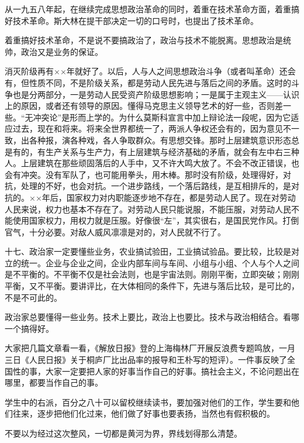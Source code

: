 从一九五八年起，在继续完成思想政治革命的同时，着重在技术革命方面，着重搞好技术革命。斯大林在提干部决定一切的口号时，也提出了技术革命。

着重搞好技术革命，不是说不要搞政治了，政治与技术不能脱离。思想政治是统帅，政治又是业务的保证。

消灭阶级再有××年就好了。以后，人与人之间思想政治斗争（或者叫革命）还会有，但性质不同，不是阶级关系，都是劳动人民先进与落后之间的矛盾。这时的斗争也是分两部分，一是劳动人民受资产阶级思想影响；一是属于主观主义——认识上的原因，或者还有领导的原因。懂得马克思主义领导艺术的好一些，否则差一些。“无冲突论”是形而上学的。为什么莫斯科宣言中加上辩论法一段呢，因为它适应过去，现在和将来。将来全世界都统一了，两派人争权还会有的，因为意见不一致，出各种报，演各种戏，各人争取群众。有思想交锋。那时上层建筑意识形态总是有的，有生产关系与生产力，有上层建筑与经济基础的矛盾，就会有左中右三种人。上层建筑在那些顽固落后的人手中，又不许大鸣大放了。不会不改正错误，也会有冲突。没有军队了，也可能用拳头，用木棒。那时没有阶级，处理得好，对抗，处理的不好，也会对抗。一个进步路线，一个落后路线，是互相排斥的，是对抗的。××年后，国家权力对内职能逐步地不存在，都是劳动人民了。现在对劳动人民来说，权力也基本不存在了。对劳动人民只能说服，不能压服，对劳动人民不能使用国家权力，用权力就是压服。好像很“左”，其实很右，是国民党作风。打倒官气，十分必要。对敌人威风凛凛是对的，对人民就不行了。

十七、政治家一定要懂些业务，农业搞试验田，工业搞试验品。要比较，比较是对立的统一。企业与企业之间，企业内部车间与车间、小组与小组、个人与个人之间是不平衡的。不平衡不仅是社会法则，也是宇宙法则。刚刚平衡，立即突破；刚刚平衡，又不平衡。要讲评比，在大体相同的条件下，先进与落后比较，是可比的，不是不可此的。

政治家总要懂得一些业务。技术上要比，政治上也要比。技术与政治相结合。看哪一个搞得好。

大家把几篇文章看一看，《解放日报》登的上海梅林厂开展反浪费专题鸣放，一月三日《人民日报》关于桐庐厂比出品率的报导和王朴写的短评）。一件事反映了全国性的事，大家一定要把人家的好事当作自己的好事。搞社会主义，不论问题出在哪里，都要当作自己的事。

学生中的右派，百分之八十可以留校继续读书，要加强对他们的工作，学生要和他们往来，逐步把他们化过来，他们做了好事也要表扬，当然也有假积极的。

不要以为经过这次整风，一切都是黄河为界，界线划得那么清楚。

